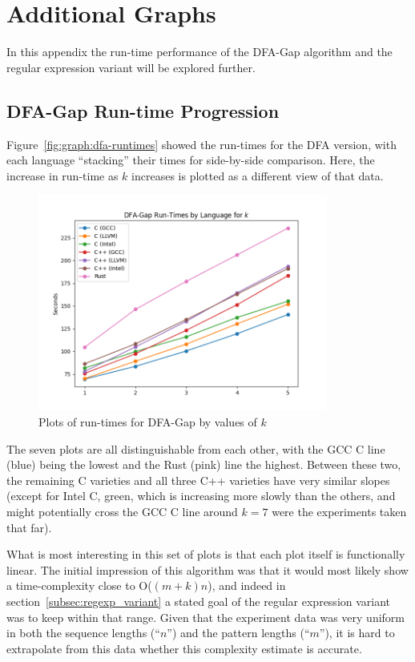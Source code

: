 \section{Additional Graphs}
\label{sec:extra_graphs}

In this appendix the run-time performance of the DFA-Gap algorithm and the regular expression variant will be explored further.

\subsection{DFA-Gap Run-time Progression}
\label{subsec:dfa-gap-runtimes}

Figure~\ref{fig:graph:dfa-runtimes} showed the run-times for the DFA version, with each language ``stacking'' their times for side-by-side comparison. Here, the increase in run-time as $k$ increases is plotted as a different view of that data.

\begin{figure}[h]
	\centering
	\includegraphics[width=0.85\textwidth]{figures/k_runtimes-dfa_gap.png}
	\caption{Plots of run-times for DFA-Gap by values of $k$}
	\label{fig:graph:k_runtimes-dfa_gap}
\end{figure}

The seven plots are all distinguishable from each other, with the GCC C line (blue) being the lowest and the Rust (pink) line the highest. Between these two, the remaining C varieties and all three C++ varieties have very similar slopes (except for Intel C, green, which is increasing more slowly than the others, and might potentially cross the GCC C line around $k=7$ were the experiments taken that far).

What is most interesting in this set of plots is that each plot itself is functionally linear. The initial impression of this algorithm was that it would most likely show a time-complexity close to O($(m+k)n$), and indeed in section~\ref{subsec:regexp_variant} a stated goal of the regular expression variant was to keep within that range. Given that the experiment data was very uniform in both the sequence lengths (``$n$'') and the pattern lengths (``$m$''), it is hard to extrapolate from this data whether this complexity estimate is accurate.

